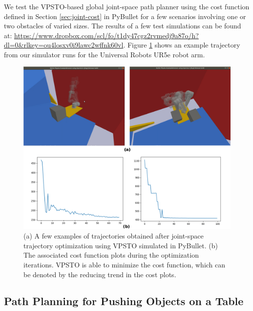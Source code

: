 We test the VPSTO-based global joint-space path planner using the cost function defined in Section \ref{sec:joint-cost} in PyBullet for a few scenarios involving one or two obstacles of varied sizes. The results of a few test simulations can be found at: \url{https://www.dropbox.com/scl/fo/t1dy47cgz2rvmedj9a87o/h?dl=0&rlkey=ou4losxv0i9lawc2wffnk60vl}. Figure \ref{fig:joint_traj_ur5} shows an example trajectory from our simulator runs for the Universal Robots UR5e robot arm. 

\begin{figure}[ht]
    \centering
    \includegraphics[scale=0.2]{figures/bl-manipulator/joint_trajs.png}
    \caption[Joint-space trajectories using VPSTO]{(a) A few examples of trajectories obtained after joint-space trajectory optimization using VPSTO simulated in PyBullet. (b) The associated cost function plots during the optimization iterations. VPSTO is able to minimize the cost function, which can be denoted by the reducing trend in the cost plots.}
    \label{fig:joint_traj_ur5}
\end{figure}

\subsection{Path Planning for Pushing Objects on a Table}

